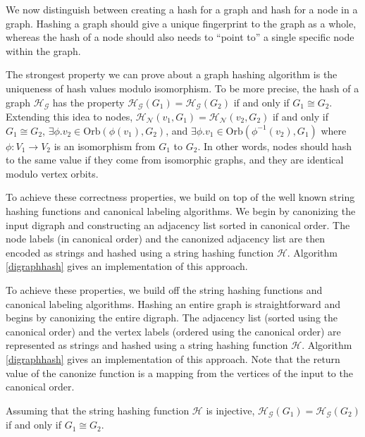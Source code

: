 \documentclass{svproc}
\begin{document}
We now distinguish between creating a hash for a graph and hash for a node in a graph. Hashing a graph should give a unique fingerprint to the graph as a whole, whereas the hash of a node should also needs to ``point to'' a single specific node within the graph.

The strongest property we can prove about a graph hashing algorithm is the uniqueness of hash values modulo isomorphism. To be more precise, the hash of a graph $\mathcal{H_G}$ has the property $\mathcal{H_G}(G_1)=\mathcal{H_G}(G_2)$ if and only if $G_1 \cong G_2$. Extending this idea to nodes, $\mathcal{H_N}(v_1, G_1)=\mathcal{H_N}(v_2, G_2)$ if and only if $G_1 \cong G_2$, $\exists \phi . v_2 \in \text{Orb}(\phi(v_1), G_2)$, and $\exists \phi . v_1 \in \text{Orb}(\phi^{-1}(v_2), G_1)$ where $\phi : V_1 \rightarrow V_2$ is an isomorphism from $G_1$ to $G_2$. In other words, nodes should hash to the same value if they come from isomorphic graphs, and they are identical modulo vertex orbits.

To achieve these correctness properties, we build on top of the well known string hashing functions and canonical labeling algorithms. We begin by canonizing the input digraph and constructing an adjacency list sorted in canonical order. The node labels (in canonical order) and the canonized adjacency list are then encoded as strings and hashed using a string hashing function $\mathcal{H}$. Algorithm \ref{digraphhash} gives an implementation of this approach.


To achieve these properties, we build off the string hashing functions and canonical labeling algorithms. Hashing an entire graph is straightforward and begins by canonizing the entire digraph. The adjacency list (sorted using the canonical order) and the vertex labels (ordered using the canonical order) are represented as strings and hashed using a string hashing function $\mathcal{H}$. Algorithm \ref{digraphhash} gives an implementation of this approach. Note that the return value of the canonize function is a mapping from the vertices of the input to the canonical order.

\begin{theorem}
\label{thm:digraphhashcorrect}
Assuming that the string hashing function $\mathcal{H}$ is injective, $\mathcal{H_G}(G_1)=\mathcal{H_G}(G_2)$ if and only if $G_1 \cong G_2$.
\end{theorem}
\end{document}

